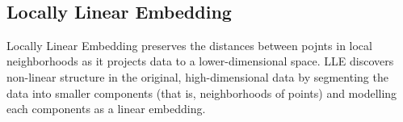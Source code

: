 \documentclass[11pt]{article}
\begin{document}
    \begin{center}
    \end{center}
    { \hspace*{\fill} \\}
    
    \subsection{Locally Linear Embedding}\label{locally-linear-embedding}

Locally Linear Embedding preserves the distances between pojnts in local
neighborhoods as it projects data to a lower-dimensional space. LLE
discovers non-linear structure in the original, high-dimensional data by
segmenting the data into smaller components (that is, neighborhoods of
points) and modelling each components as a linear embedding.
\end{document}
